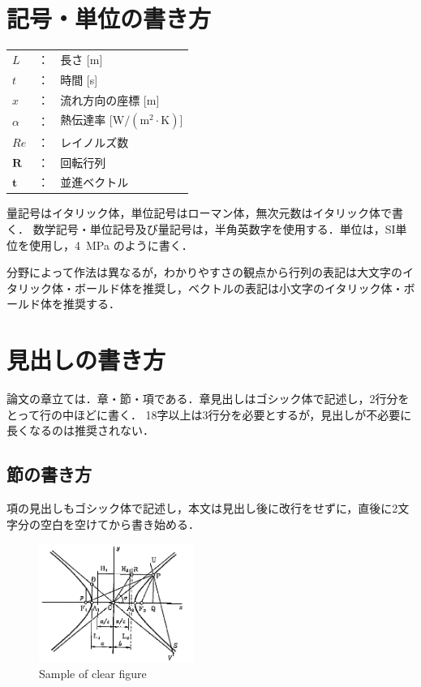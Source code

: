 \documentclass[10pt]{ujarticle}
\begin{document}
    \section{記号・単位の書き方}%
    \begin{table}[!h]
        \begin{tabular}{lcl}
            $L$ & ： & 長さ [m] \\
            $t$ & ： & 時間 [s] \\
            $x$ & ： & 流れ方向の座標 [m] \\
            $\alpha$ & ： & 熱伝達率 [$\mathrm{W/(m^2\cdot K)}$] \\
            $Re$ & ： & レイノルズ数 \\
            $\bm{R}$ & ： & 回転行列 \\
            $\bm{t}$ & ： & 並進ベクトル \\
        \end{tabular}
    \end{table}
    
    量記号はイタリック体，単位記号はローマン体，無次元数はイタリック体で書く．
    数学記号・単位記号及び量記号は，半角英数字を使用する．単位は，SI単位を使用し，4~MPa のように書く．
    
    分野によって作法は異なるが，わかりやすさの観点から行列の表記は大文字のイタリック体・ボールド体を推奨し，ベクトルの表記は小文字のイタリック体・ボールド体を推奨する．
    
    \section{見出しの書き方}%
    
    論文の章立ては．章・節・項である．章見出しはゴシック体で記述し，2行分をとって行の中ほどに書く．
    18字以上は3行分を必要とするが，見出しが不必要に長くなるのは推奨されない．
    
    \subsection{節の書き方}
    
    項の見出しもゴシック体で記述し，本文は見出し後に改行をせずに，直後に2文字分の空白を空けてから書き始める．
    
    \begin{center}
        \begin{figure}[!b]
            \includegraphics[width=0.45\textwidth]{./fig/sample.png}
            \caption{Sample of clear figure}
            \label{fig:sample-fig}
        \end{figure}
    \end{center}
    
\end{document}
